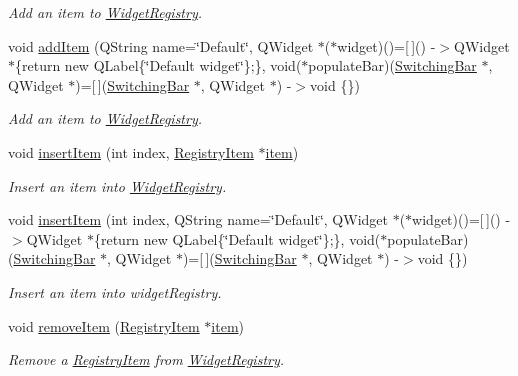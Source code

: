 \begin{DoxyCompactItemize}
\begin{DoxyCompactList}\small\item\em Add an item to \hyperlink{class_widget_registry}{Widget\+Registry}. \end{DoxyCompactList}\item 
void \hyperlink{class_widget_registry_a545df9d9afbcfa625795cb7d2834aac5}{add\+Item} (Q\+String name=\char`\"{}Default\char`\"{}, Q\+Widget $\ast$($\ast$widget)()=\mbox{[}$\,$\mbox{]}() -\/$>$Q\+Widget $\ast$\{return new Q\+Label\{\char`\"{}Default widget\char`\"{}\};\}, void($\ast$populate\+Bar)(\hyperlink{class_switching_bar}{Switching\+Bar} $\ast$, Q\+Widget $\ast$)=\mbox{[}$\,$\mbox{]}(\hyperlink{class_switching_bar}{Switching\+Bar} $\ast$, Q\+Widget $\ast$) -\/$>$void \{\})
\begin{DoxyCompactList}\small\item\em Add an item to \hyperlink{class_widget_registry}{Widget\+Registry}. \end{DoxyCompactList}\item 
void \hyperlink{class_widget_registry_a3a323a51d1e65d61d6ed9b8639a21070}{insert\+Item} (int index, \hyperlink{class_registry_item}{Registry\+Item} $\ast$\hyperlink{class_widget_registry_a432f0e1f366c3d5dce760e83fd8260fe}{item})
\begin{DoxyCompactList}\small\item\em Insert an item into \hyperlink{class_widget_registry}{Widget\+Registry}. \end{DoxyCompactList}\item 
void \hyperlink{class_widget_registry_ac39d282b5e1639e3e9a3e0dfdae8e92e}{insert\+Item} (int index, Q\+String name=\char`\"{}Default\char`\"{}, Q\+Widget $\ast$($\ast$widget)()=\mbox{[}$\,$\mbox{]}() -\/$>$Q\+Widget $\ast$\{return new Q\+Label\{\char`\"{}Default widget\char`\"{}\};\}, void($\ast$populate\+Bar)(\hyperlink{class_switching_bar}{Switching\+Bar} $\ast$, Q\+Widget $\ast$)=\mbox{[}$\,$\mbox{]}(\hyperlink{class_switching_bar}{Switching\+Bar} $\ast$, Q\+Widget $\ast$) -\/$>$void \{\})
\begin{DoxyCompactList}\small\item\em Insert an item into widget\+Registry. \end{DoxyCompactList}\item 
void \hyperlink{class_widget_registry_a076561002958c840a9096d27cdbfdeed}{remove\+Item} (\hyperlink{class_registry_item}{Registry\+Item} $\ast$\hyperlink{class_widget_registry_a432f0e1f366c3d5dce760e83fd8260fe}{item})
\begin{DoxyCompactList}\small\item\em Remove a \hyperlink{class_registry_item}{Registry\+Item} from \hyperlink{class_widget_registry}{Widget\+Registry}. \end{DoxyCompactList}\item 

\end{DoxyCompactItemize}
